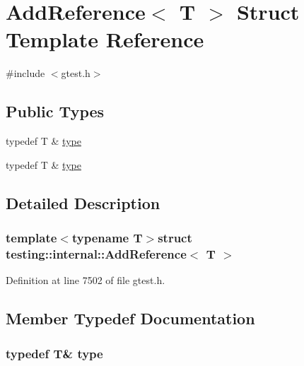 \hypertarget{structtesting_1_1internal_1_1AddReference}{\section{\-Add\-Reference$<$ \-T $>$ \-Struct \-Template \-Reference}
\label{d6/dc0/structtesting_1_1internal_1_1AddReference}
}


{\ttfamily \#include $<$gtest.\-h$>$}

\subsection*{\-Public \-Types}
\begin{DoxyCompactItemize}
\item 
typedef \-T \& \hyperlink{structtesting_1_1internal_1_1AddReference_a08e05528fbb401bd8299a21d67d13ee3}{type}
\item 
typedef \-T \& \hyperlink{structtesting_1_1internal_1_1AddReference_a08e05528fbb401bd8299a21d67d13ee3}{type}
\end{DoxyCompactItemize}


\subsection{\-Detailed \-Description}
\subsubsection*{template$<$typename T$>$struct testing\-::internal\-::\-Add\-Reference$<$ T $>$}



\-Definition at line 7502 of file gtest.\-h.



\subsection{\-Member \-Typedef \-Documentation}
\hypertarget{structtesting_1_1internal_1_1AddReference_a08e05528fbb401bd8299a21d67d13ee3}{
\subsubsection[{type}]{\setlength{\rightskip}{0pt plus 5cm}typedef \-T\& {\bf type}}}\label{d6/dc0/structtesting_1_1internal_1_1AddReference_a08e05528fbb401bd8299a21d67d13ee3}


